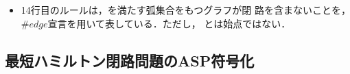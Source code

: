 \begin{itemize}
\item  14行目のルールは，を満たす弧集合をもつグラフが閉
  路を含まないことを，$\#edge$宣言を用いて表している．ただし，
  とは始点ではない．
\end{itemize}

\subsection{最短ハミルトン閉路問題のASP符号化}\label{minexpl}





